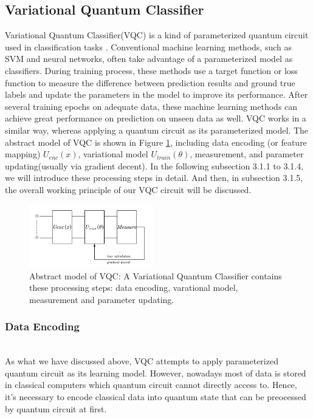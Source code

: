 \documentclass[sigconf]{acmart}
\begin{document}
\subsection{Variational Quantum Classifier}
Variational Quantum Classifier(VQC) is a kind of parameterized quantum circuit used in classification tasks \cite{havlivcek2019supervised}. Conventional machine learning methods, such as SVM and neural networks, often take advantage of a parameterized model as classifiers. During training process, these methods use a target function or loss function to measure the difference between prediction results and ground true labels and update the parameters in the model to improve its performance. After several training epochs on adequate data, these machine learning methods can achieve great performance on prediction on unseen data as well. VQC works in a similar way, whereas applying a quantum circuit as its parameterized model. The abstract model of VQC is shown in Figure \ref{fig:VQC}, including data encoding (or feature mapping) $U_{enc}(x)$, variational model $U_{train}(\theta)$, measurement, and parameter updating(usually via gradient decent). In the following subsection 3.1.1 to 3.1.4, we will introduce these processing steps in detail. And then, in subsection 3.1.5, the overall working principle of our VQC circuit will be discussed.
\begin{figure}[!ht]
	\centering
	\includegraphics[width=0.48\textwidth]{VQC.png}
	\caption{Abstract model of VQC: {\small \textnormal{ A Variational Quantum Classifier contains these processing steps: data encoding, varational model, measurement and parameter updating.}} }
	\label{fig:VQC}
\end{figure}

\subsubsection{Data Encoding}\hfill\\
As what we have discussed above, VQC attempts to apply parameterized quantum circuit as its learning model. However, nowadays most of data is stored in classical computers which quantum circuit cannot directly access to. Hence, it's necessary to encode classical data into quantum state that can be preocessed by quantum circuit at first. 
\end{document}
